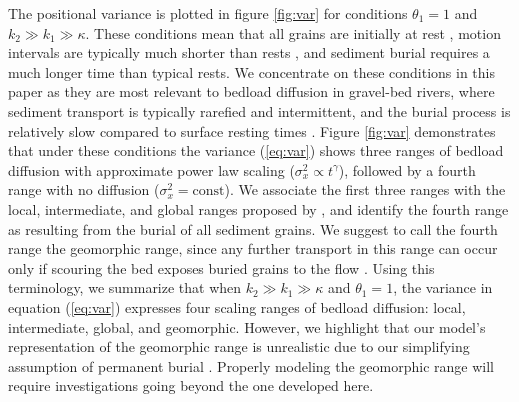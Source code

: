 \documentclass[]{agujournal2018}
\begin{document}
The positional variance is plotted in figure \ref{fig:var} for conditions $\theta_1=1$ and $k_2\gg k_1 \gg \kappa$.
These conditions mean that all grains are initially at rest \citep[cf.][]{Wu2019}, motion intervals are typically much shorter than rests \citep[cf.][]{Einstein1937}, and sediment burial requires a much longer time than typical rests.
We concentrate on these conditions in this paper as they are most relevant to bedload diffusion in gravel-bed rivers, where sediment transport is typically rarefied and intermittent, and the burial process is relatively slow compared to surface resting times \citep[e.g.][]{Ferguson2002,Hassan1994}.
Figure \ref{fig:var} demonstrates that under these conditions the variance (\ref{eq:var}) shows three ranges of bedload diffusion with approximate power law scaling ($\sigma_x^2 \propto t^\gamma$), followed by a fourth range with no diffusion ($\sigma_x^2 = \text{const}$). We associate the first three ranges with the local, intermediate, and global ranges proposed by \citet{Nikora2001a,Nikora2002}, and identify the fourth range as resulting from the burial of all sediment grains.
We suggest to call the fourth range the geomorphic range, since any further transport in this range can occur only if scouring the bed exposes buried grains to the flow \citep[cf.][]{Nakagawa1980,Voepel2013,Martin2014}.
Using this terminology, we summarize that when $k_2\gg k_1 \gg \kappa$ and $\theta_1=1$, the variance in equation (\ref{eq:var}) expresses four scaling ranges of bedload diffusion: local, intermediate, global, and geomorphic.
However, we highlight that our model's representation of the geomorphic range is unrealistic due to our simplifying assumption of permanent burial \citep[cf.][]{Wu2019}. Properly modeling the geomorphic range will require investigations going beyond the one developed here.
\end{document}
